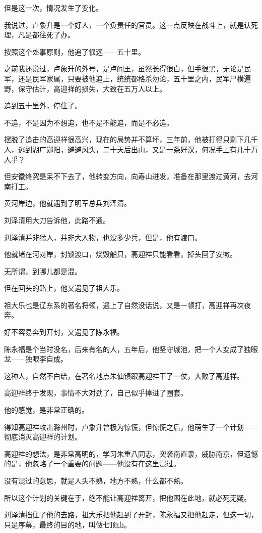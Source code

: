 \begin{multicols}{\theparacolNo}
但是这一次，情况发生了变化。

我说过，卢象升是一个好人，一个负责任的官员。这一点反映在战斗上，就是认死理，凡是都往死了办。

按照这个处事原则，他追了很远——五十里。

之前我还说过，卢象升的外号，是卢阎王，虽然长得很白，但手很黑，无论是民军，还是民军家属，只要被他追上，统统都格杀勿论，五十里之内，民军尸横遍野，保守估计，高迎祥的损失，大致在五万人以上。

追到五十里外，停住了。

不追，不是因为不想追，也不是不能追，而是不必追。

摆脱了追击的高迎祥很高兴，现在的局势并不算坏，三年前，他被打得只剩下几千人，逃到湖广郧阳，避避风头，二十天后出山，又是一条好汉，何况手上有几十万人乎？

但安徽终究是呆不下去了，他转变方向，向寿山进发，准备在那里渡过黄河，去河南打工。

黄河岸边，他就遇到了明军总兵刘泽清。

刘泽清用大刀告诉他，此路不通。

刘泽清并非猛人，并非大人物，也没多少兵，但是，他有渡口。

他就堵在河对岸，封锁渡口，烧毁船只，高迎祥只能看看，掉头回了安徽。

无所谓，到哪儿都是混。

但在回头的路上，他又遇见了祖大乐。

祖大乐也是辽东系的著名将领，遇上了自然没话说，又是一顿打，高迎祥再次夜奔。

好不容易奔到开封，又遇见了陈永福。

陈永福是个当时没名，后来有名的人，五年后，他坚守城池，把一个人变成了独眼龙——独眼李自成。

这种人，自然不白给，在著名地点朱仙镇跟高迎祥干了一仗，大败了高迎祥。

高迎祥终于发现，事情不大对劲了，自己似乎掉进了圈套。

他的感觉，是非常正确的。

得知高迎祥攻击滁州时，卢象升曾极为惊慌，但惊慌之后，他萌生了一个计划——彻底消灭高迎祥的计划。

高迎祥的想法，是非常高明的，学习朱重八同志，突袭南直隶，威胁南京，但遗憾的是，他忽略了一个重要的问题——他没有在这里混过。

没有混过的意思，就是人头不熟，地方不熟，什么都不熟。

所以这个计划的关键在于，绝不能让高迎祥离开，把他困在此地，就必死无疑。

刘泽清挡住了他的去路，祖大乐把他赶到了开封，陈永福又把他赶走，但这一切，只是序幕，最终的目的地，叫做七顶山。


\end{multicols}
